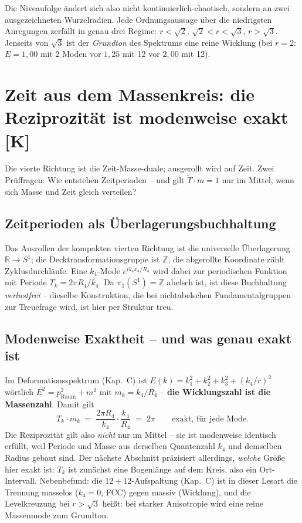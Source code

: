 \documentclass[11pt]{report}
\begin{document}
Die Niveaufolge ändert sich also nicht kontinuierlich-chaotisch,
sondern an zwei ausgezeichneten Wurzelradien. Jede Ordnungsaussage
über die niedrigsten Anregungen zerfällt in genau drei Regime:
$r < \sqrt2$, $\sqrt2 < r < \sqrt3$, $r > \sqrt3$. Jenseits von
$\sqrt3$ ist der \emph{Grundton} des Spektrums eine reine Wicklung
(bei $r = 2$: $E = 1{,}00$ mit 2 Moden vor $1{,}25$ mit 12 vor
$2{,}00$ mit 12).

\chapter{Zeit aus dem Massenkreis: die Reziprozität ist modenweise exakt [K]}

Die vierte Richtung ist die Zeit-Masse-duale; ausgerollt wird auf
Zeit. Zwei Prüffragen: Wie entstehen Zeitperioden -- und gilt
$\tilde T\cdot m = 1$ nur im Mittel, wenn sich Masse und Zeit
gleich verteilen?

\section{Zeitperioden als Überlagerungsbuchhaltung}

Das Ausrollen der kompakten vierten Richtung ist die universelle
Überlagerung $\mathbb{R}\to S^1$; die Decktransformationsgruppe
ist $\mathbb{Z}$, die abgerollte Koordinate zählt
Zyklusdurchläufe. Eine $k_4$-Mode $e^{ik_4x_4/R_4}$ wird dabei
zur periodischen Funktion mit Periode $T_k = 2\pi R_4/k_4$. Da
$\pi_1(S^1) = \mathbb{Z}$ abelsch ist, ist diese Buchhaltung
\emph{verlustfrei} -- dieselbe Konstruktion, die bei
nichtabelschen Fundamentalgruppen zur Treuefrage wird, ist hier
per Struktur treu.

\section{Modenweise Exaktheit -- und was genau exakt ist}

Im Deformationsspektrum (Kap.~C) ist
$E(k) = k_1^2+k_2^2+k_3^2 + (k_4/r)^2$ wörtlich
$E^2 = p_\text{Raum}^2 + m^2$ mit $m_k = k_4/R_4$ -- \textbf{die
Wicklungszahl ist die Massenzahl}. Damit gilt
\begin{equation}
  T_k \cdot m_k \;=\; \frac{2\pi R_4}{k_4}\cdot\frac{k_4}{R_4}
  \;=\; 2\pi
  \qquad\text{exakt, für jede Mode.}
\end{equation}
Die Reziprozität gilt also \emph{nicht} nur im Mittel -- sie ist
modenweise identisch erfüllt, weil Periode und Masse aus derselben
Quantenzahl $k_4$ und demselben Radius gebaut sind. Der nächste
Abschnitt präzisiert allerdings, \emph{welche} Größe hier exakt
ist: $T_k$ ist zunächst eine Bogenlänge auf dem Kreis, also ein
Ort-Intervall. Nebenbefund:
die $12+12$-Aufspaltung (Kap.~C) ist in dieser Lesart die
Trennung masselos ($k_4 = 0$, FCC) gegen massiv (Wicklung), und
die Levelkreuzung bei $r > \sqrt3$ heißt: bei starker Anisotropie
wird eine reine Massenmode zum Grundton.
\end{document}
